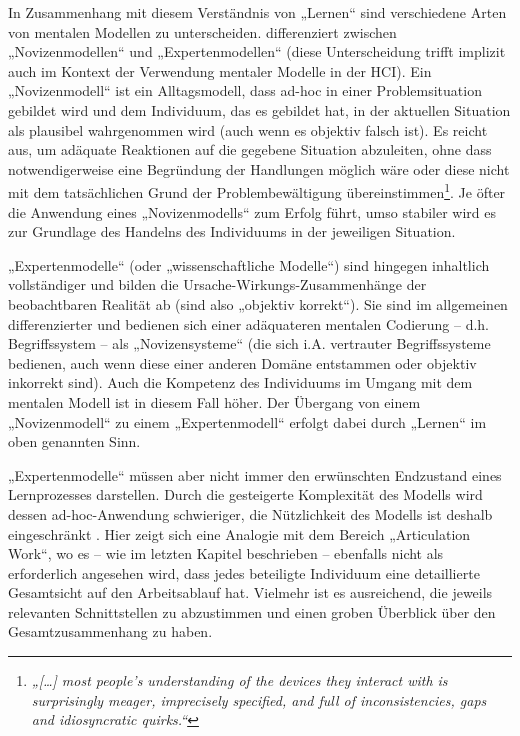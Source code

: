 In Zusammenhang mit diesem Verständnis von „Lernen“ sind verschiedene Arten von mentalen Modellen zu unterscheiden. \citet{Seel91} differenziert zwischen „Novizenmodellen“ und „Expertenmodellen“ (diese Unterscheidung trifft implizit auch \citet{Norman83a} im Kontext der Verwendung mentaler Modelle in der \gls{HCI}). Ein „Novizenmodell“ ist ein Alltagsmodell, dass ad-hoc in einer Problemsituation gebildet wird und dem Individuum, das es gebildet hat, in der aktuellen Situation als plausibel wahrgenommen wird (auch wenn es objektiv falsch ist). Es reicht aus, um adäquate Reaktionen auf die gegebene Situation abzuleiten, ohne dass notwendigerweise eine Begründung der Handlungen möglich wäre oder diese nicht mit dem tatsächlichen Grund der Problembewältigung übereinstimmen\footnote{\emph{„[\ldots] most people’s understanding of the devices they interact with is surprisingly meager, imprecisely specified, and full of inconsistencies, gaps and idiosyncratic quirks.“}\citep[][S. 8]{Norman83a}}. Je öfter die Anwendung eines „Novizenmodells“ zum Erfolg führt, umso stabiler wird es zur Grundlage des Handelns des Individuums in der jeweiligen Situation. 

„Expertenmodelle“ (oder „wissenschaftliche Modelle“) sind hingegen inhaltlich vollständiger und bilden die Ursache-Wirkungs-Zusammenhänge der beobachtbaren Realität ab (sind also „objektiv korrekt“). Sie sind im allgemeinen differenzierter und bedienen sich einer adäquateren mentalen Codierung -- d.h. Begriffssystem -- als „Novizensysteme“ (die sich i.A. vertrauter Begriffssysteme bedienen, auch wenn diese einer anderen Domäne entstammen oder objektiv inkorrekt sind). Auch die Kompetenz des Individuums im Umgang mit dem mentalen Modell ist in diesem Fall höher. Der Übergang von einem „Novizenmodell“ zu einem „Expertenmodell“ erfolgt dabei durch „Lernen“ im oben genannten Sinn. \citep{Ifenthaler06}

„Expertenmodelle“ müssen aber nicht immer den erwünschten Endzustand eines Lernprozesses darstellen. Durch die gesteigerte Komplexität des Modells wird dessen ad-hoc-Anwendung schwieriger, die Nützlichkeit des Modells ist deshalb eingeschränkt \citep[vgl. ][S. 20]{Ifenthaler06}. Hier zeigt sich eine Analogie mit dem Bereich „Articulation Work“, wo es -- wie im letzten Kapitel beschrieben -- ebenfalls nicht als erforderlich angesehen wird, dass jedes beteiligte Individuum eine detaillierte Gesamtsicht auf den Arbeitsablauf hat. Vielmehr ist es ausreichend, die jeweils relevanten Schnittstellen zu abzustimmen und einen groben Überblick über den Gesamtzusammenhang zu haben. 

